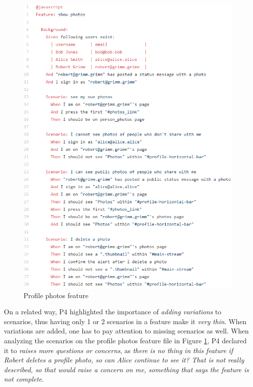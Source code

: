 \begin{figure}[h]
	\centering
	\includegraphics[scale=0.8]{images/complete_profile_photos_feature}
	\caption[\hspace{2mm}Profile photos feature]{Profile photos feature}
	\label{fig:complete_profile_photos_feature}
\end{figure}

On a related way, P4 highlighted the importance of \textit{adding variations} to scenarios, thus having only 1 or 2 scenarios in a feature make it \textit{very thin}. When variations are added, one has to pay attention to missing scenarios as well. When analyzing the scenarios on the profile photos feature file in Figure \ref{fig:complete_profile_photos_feature}, P4 declared it to \textit{raises more questions or concerns}, as \textit{there is no thing in this feature if Robert deletes a profile photo, so can Alice continue to see it? That is not really described, so that would raise a concern on me, something that says the feature is not complete}.

